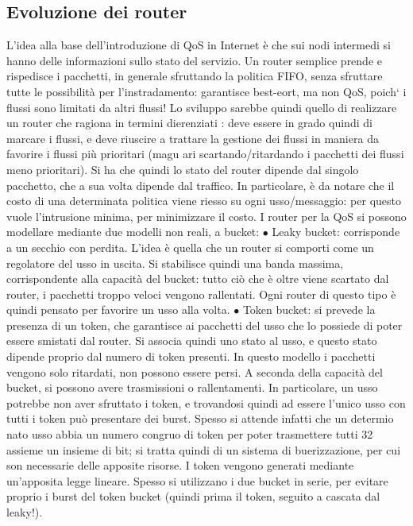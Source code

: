 \subsection{Evoluzione dei router}
L'idea alla base dell'introduzione di QoS in Internet è che sui nodi intermedi si
hanno delle informazioni sullo stato del servizio. Un router semplice prende e
rispedisce i pacchetti, in generale sfruttando la politica FIFO, senza sfruttare
tutte le possibilità per l'instradamento: garantisce best-eort, ma non QoS,
poich` i flussi sono limitati da altri flussi!
Lo sviluppo sarebbe quindi quello di realizzare un router che ragiona in termini dierenziati : deve essere in grado
quindi di marcare i flussi, e deve riuscire
a trattare la gestione dei flussi in maniera da favorire i flussi più prioritari (magu
ari scartando/ritardando i pacchetti dei flussi meno prioritari). Si ha che quindi
lo stato del router dipende dal singolo pacchetto, che a sua volta dipende dal
traffico. In particolare, è da notare che il costo di una determinata politica
viene riesso su ogni usso/messaggio: per questo vuole l'intrusione minima,
per minimizzare il costo.
I router per la QoS si possono modellare mediante due modelli non reali, a
bucket:
$\bullet$ Leaky bucket: corrisponde a un secchio con perdita. L'idea è quella che
un router si comporti come un regolatore del usso in uscita. Si stabilisce
quindi una banda massima, corrispondente alla capacità del bucket: tutto
ciò che è oltre viene scartato dal router, i pacchetti troppo veloci vengono
rallentati. Ogni router di questo tipo è quindi pensato per favorire un
usso alla volta.
$\bullet$ Token bucket: si prevede la presenza di un token, che garantisce ai pacchetti del usso che lo possiede di
poter essere smistati dal router. Si associa
quindi uno stato al usso, e questo stato dipende proprio dal numero di
token presenti. In questo modello i pacchetti vengono solo ritardati, non
possono essere persi. A seconda della capacità del bucket, si possono avere
trasmissioni o rallentamenti. In particolare, un usso potrebbe non aver
sfruttato i token, e trovandosi quindi ad essere l'unico usso con tutti i
token può presentare dei burst. Spesso si attende infatti che un determio
nato usso abbia un numero congruo di token per poter trasmettere tutti
32
assieme un insieme di bit; si tratta quindi di un sistema di buerizzazione,
per cui son necessarie delle apposite risorse. I token vengono generati
mediante un'apposita legge lineare.
Spesso si utilizzano i due bucket in serie, per evitare proprio i burst del token
bucket (quindi prima il token, seguito a cascata dal leaky!).
